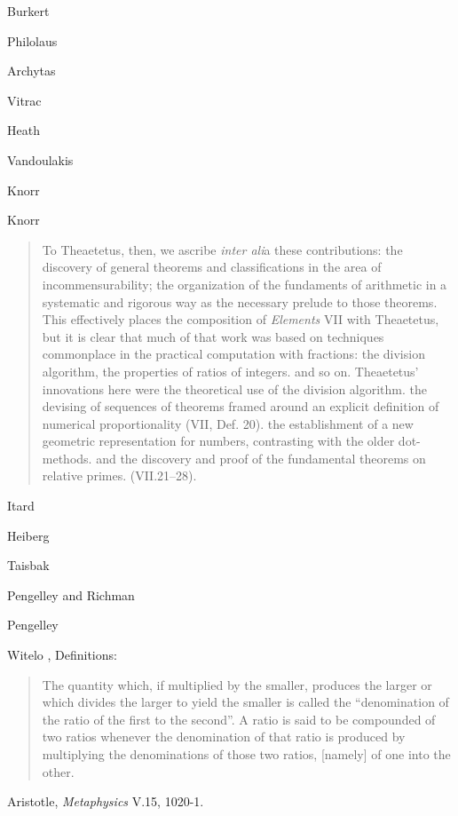 \documentclass{article}
\begin{document}
Burkert \cite{burkert}

Philolaus \cite{philolaus}

Archytas \cite{archytas}

Vitrac \cite[p.~305]{vitrac2}

Heath \cite{euclidII}

Vandoulakis \cite{vandoulakis}

Knorr \cite[p.~212]{knorr}

Knorr \cite[p.~244]{knorr}

\begin{quote}
To Theaetetus, then, we ascribe {\em inter ali}a these contributions: the discovery of general theorems and classifications in the area of
incommensurability; the organization of the fundaments of arithmetic in a systematic
and rigorous way as the necessary prelude to those theorems. This effectively places the composition of {\em Elements} VII with Theaetetus, but it is
clear that much of that work was based on techniques commonplace in
the practical computation with fractions: the division algorithm, the properties of ratios of integers. and so on. Theaetetus' innovations here were
the theoretical use of the division algorithm. the devising of sequences
of theorems framed around an explicit definition of numerical proportionality (VII, Def. 20). the establishment of a new geometric representation for
numbers, contrasting with the older dot-methods. and the
discovery and proof of the fundamental theorems on relative primes.
(VII.21--28).
\end{quote}

Itard \cite{itard}

Heiberg \cite{euclidisII}

Taisbak \cite{taisbak}

Pengelley and Richman \cite{pengelley}

Pengelley \cite{pengelley2013}

Witelo \cite[p.~47]{witelo}, Definitions:

\begin{quote}
The quantity which, if multiplied by the smaller, produces the larger or which divides
the larger to yield the smaller is called the ``denomination of the ratio of the
first to the second''. A ratio is said to be compounded of two ratios whenever
the denomination of that ratio is produced by multiplying the denominations of
those two ratios, [namely] of one into the other.
\end{quote}

Aristotle, {\em Metaphysics} V.15, 1020-1.
\end{document}
